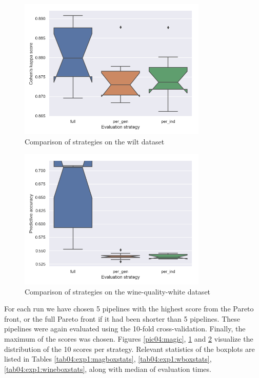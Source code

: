 \begin{figure}[pt]\centering
\includegraphics[width=0.8\textwidth]{../img/wilt-out.png}
\caption{Comparison of strategies on the wilt dataset}
\label{pic04:wilt}
\end{figure}

\begin{figure}[pt]\centering
\includegraphics[width=0.8\textwidth]{../img/winequality-out.png}
\caption{Comparison of strategies on the wine-quality-white dataset}
\label{pic04:winequality}
\end{figure}

For each run we have chosen 5 pipelines with the highest score
from the Pareto front, or the full Pareto front if it had been shorter than 5
pipelines. These pipelines were again evaluated using the 10-fold
cross-validation. Finally, the maximum of the scores was chosen. Figures
\ref{pic04:magic}, \ref{pic04:wilt} and \ref{pic04:winequality} visualize the
distribution of the 10 scores per strategy. Relevant statistics of the
boxplots are listed in Tables \ref{tab04:exp1:magboxstats},
\ref{tab04:exp1:wboxstats}, \ref{tab04:exp1:wineboxstats}, along with median of
evaluation times.

